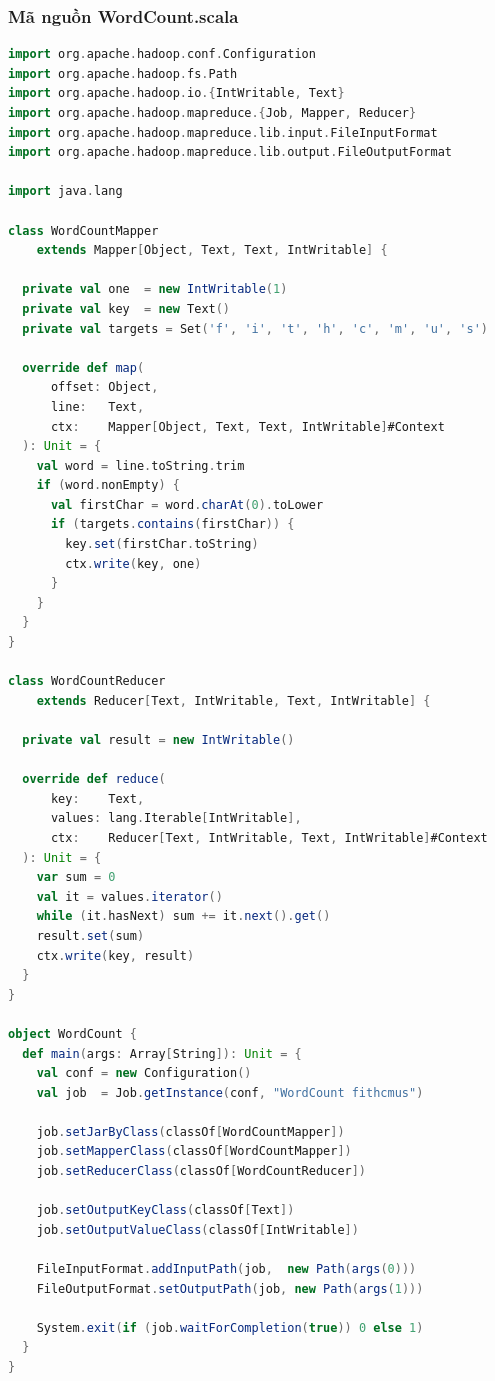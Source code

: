 \subsubsection{Mã nguồn WordCount.scala}

\begin{lstlisting}[language=scala, caption={Mã nguồn WordCount.scala — Hadoop MapReduce bằng Scala.}]
import org.apache.hadoop.conf.Configuration
import org.apache.hadoop.fs.Path
import org.apache.hadoop.io.{IntWritable, Text}
import org.apache.hadoop.mapreduce.{Job, Mapper, Reducer}
import org.apache.hadoop.mapreduce.lib.input.FileInputFormat
import org.apache.hadoop.mapreduce.lib.output.FileOutputFormat

import java.lang

class WordCountMapper
    extends Mapper[Object, Text, Text, IntWritable] {

  private val one  = new IntWritable(1)
  private val key  = new Text()
  private val targets = Set('f', 'i', 't', 'h', 'c', 'm', 'u', 's')

  override def map(
      offset: Object,
      line:   Text,
      ctx:    Mapper[Object, Text, Text, IntWritable]#Context
  ): Unit = {
    val word = line.toString.trim
    if (word.nonEmpty) {
      val firstChar = word.charAt(0).toLower
      if (targets.contains(firstChar)) {
        key.set(firstChar.toString)
        ctx.write(key, one)
      }
    }
  }
}

class WordCountReducer
    extends Reducer[Text, IntWritable, Text, IntWritable] {

  private val result = new IntWritable()

  override def reduce(
      key:    Text,
      values: lang.Iterable[IntWritable],
      ctx:    Reducer[Text, IntWritable, Text, IntWritable]#Context
  ): Unit = {
    var sum = 0
    val it = values.iterator()
    while (it.hasNext) sum += it.next().get()
    result.set(sum)
    ctx.write(key, result)
  }
}

object WordCount {
  def main(args: Array[String]): Unit = {
    val conf = new Configuration()
    val job  = Job.getInstance(conf, "WordCount fithcmus")

    job.setJarByClass(classOf[WordCountMapper])
    job.setMapperClass(classOf[WordCountMapper])
    job.setReducerClass(classOf[WordCountReducer])

    job.setOutputKeyClass(classOf[Text])
    job.setOutputValueClass(classOf[IntWritable])

    FileInputFormat.addInputPath(job,  new Path(args(0)))
    FileOutputFormat.setOutputPath(job, new Path(args(1)))

    System.exit(if (job.waitForCompletion(true)) 0 else 1)
  }
}
\end{lstlisting}

